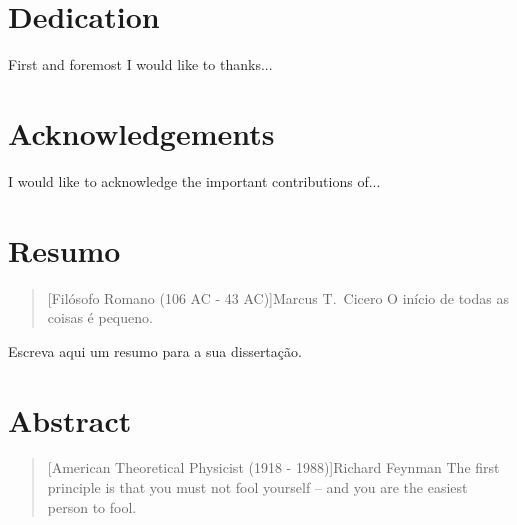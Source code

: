 \documentclass[final]{rc-book-2.14}
\begin{document}
\chapter{Dedication}
\label{chp:dedication}

\drop First and foremost I would like to thanks...


\chapter{Acknowledgements}
\label{chp:acknowledge}

\drop I would like to acknowledge the important contributions of...


\chapter{Resumo}
\label{chp:general-abstract:portuguese}

\begin{quotation}[Filósofo Romano (106 AC - 43 AC)]{Marcus T.~Cicero}
    O início de todas as coisas é pequeno.
\end{quotation}


\begin{otherlanguage}{portuguese}
    \drop Escreva aqui um resumo para a sua dissertação.
\end{otherlanguage}


\chapter{Abstract}
\label{chp:general-abstract:english}


\begin{quotation}[American Theoretical Physicist (1918 - 1988)]{Richard Feynman}
    The first principle is that you must not fool yourself – and you are the easiest person to fool.
\end{quotation}
\end{document}
